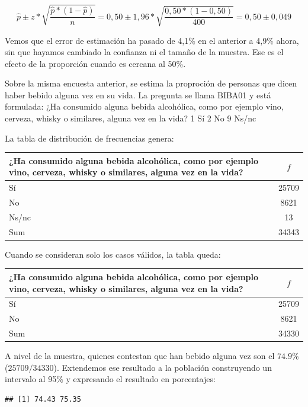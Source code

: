 \documentclass[]{book}
\begin{document}
\[\widehat{p} \pm z*\sqrt{\frac{\widehat{p}*(1 - \widehat{p})}{n}} = 0,50 \pm 1,96*\sqrt{\frac{0,50*(1 - 0,50)}{400}} = 0,50 \pm 0,049\]

Vemos que el error de estimación ha pasado de 4,1\% en el anterior a 4,9\%
ahora, sin que hayamos cambiado la confianza ni el tamaño de la muestra.
Ese es el efecto de la proporción cuando es cercana al 50\%.

Sobre la misma encuesta anterior, se estima la proproción de personas que dicen haber bebido alguna vez en su vida. La pregunta se llama BIBA01 y está formulada:
¿Ha consumido alguna bebida alcohólica, como por ejemplo vino, cerveza, whisky o similares, alguna vez en la vida?
1 Sí
2 No
9 Ns/nc

La tabla de distribución de frecuencias genera:

\begin{table}[H]
\centering
\begin{tabular}{lc}
\toprule
¿Ha consumido alguna bebida alcohólica, como por ejemplo vino, cerveza, whisky o similares, alguna vez en la vida? & $f$\\
\midrule
\rowcolor{gray!6}  Sí & 25709\\
No & 8621\\
\rowcolor{gray!6}  Ns/nc & 13\\
Sum & 34343\\
\bottomrule
\end{tabular}
\end{table}

Cuando se consideran solo los casos válidos, la tabla queda:

\begin{table}[H]
\centering
\begin{tabular}{lc}
\toprule
¿Ha consumido alguna bebida alcohólica, como por ejemplo vino, cerveza, whisky o similares, alguna vez en la vida? & $f$\\
\midrule
\rowcolor{gray!6}  Sí & 25709\\
No & 8621\\
\rowcolor{gray!6}  Sum & 34330\\
\bottomrule
\end{tabular}
\end{table}

A nivel de la muestra, quienes contestan que han bebido alguna vez son el \(74.9\)\% (\(25709/34330\)). Extendemos ese resultado a la población construyendo un intervalo al 95\% y expresando el resultado en porcentajes:

\begin{verbatim}
## [1] 74.43 75.35
\end{verbatim}
\end{document}
